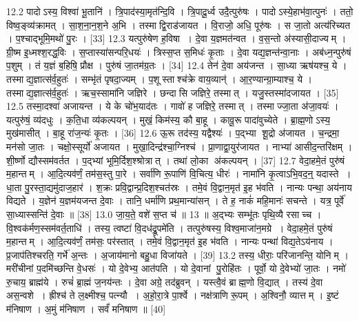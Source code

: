 12.2
पादोऽस्य॒ विश्वा॑ भू॒तानि॑ । त्रि॒पाद॑स्या॒मृत॑न्दि॒वि । त्रि॒पादू॒र्ध्व उदै॒त्पुरु॑षः । पादोऽस्ये॒हाभ॑वा॒त्पुनः॑ । ततो॒ विष्व॒ङ्व्य॑क्रामत् । सा॒श॒ना॒न॒श॒ने अ॒भि । तस्माद्वि॒राड॑जायत । वि॒राजो॒ अधि॒ पूरु॑षः । स जा॒तो अत्य॑रिच्यत । प॒श्चाद्भूमि॒मथो॑ पु॒रः । [33]
12.3
यत्पुरु॑षेण ह॒विषा । दे॒वा य॒ज्ञमत॑न्वत । व॒स॒न्तो अ॑स्यासी॒दाज्यम् । ग्री॒ष्म इ॒ध्मश्श॒रद्ध॒विः । स॒प्तास्या॑सन्परि॒धयः॑ । त्रिस्स॒प्त स॒मिधः॑ कृ॒ताः । दे॒वा यद्य॒ज्ञन्त॑न्वा॒नाः । अब॑ध्न॒न्पुरु॑षं प॒शुम् । तं य॒ज्ञं ब॒\ar{}हिषि॒ प्रौक्ष\sn{} । पुरु॑षं जा॒तम॑ग्र॒तः । [34]
12.4
तेन॑ दे॒वा अय॑जन्त । सा॒ध्या ऋष॑यश्च॒ ये । तस्माद्य॒ज्ञात्स॑र्व॒हुतः॑ । सम्भृ॑तं पृषदा॒ज्यम् । प॒शूस्ताश्च॑क्रे वाय॒व्यान्॑ । आ॒र॒ण्यान्ग्रा॒म्याश्च॒ ये । तस्माद्य॒ज्ञात्स॑र्व॒हुतः॑ । ऋच॒स्सामा॑नि जज्ञिरे । छन्दासि जज्ञिरे॒ तस्मात् । यजु॒स्तस्मा॑दजायत । [35]
12.5
तस्मा॒दश्वा॑ अजायन्त । ये के चो॑भ॒याद॑तः । गावो॑ ह जज्ञिरे॒ तस्मात् । तस्माज्जा॒ता अ॑जा॒वयः॑ । यत्पुरु॑षं॒ व्य॑दधुः । क॒ति॒धा व्य॑कल्पयन् । मुखं॒ किम॑स्य॒ कौ बा॒हू । कावू॒रू पादा॑वुच्येते । ब्रा॒ह्म॒णोऽस्य॒ मुख॑मासीत् । बा॒हू रा॑ज॒न्यः॑ कृ॒तः । [36]
12.6
ऊ॒रू तद॑स्य॒ यद्वैश्यः॑ । प॒द्भ्या शू॒द्रो अ॑जायत । च॒न्द्रमा॒ मन॑सो जा॒तः । चक्षो॒स्सूर्यो॑ अजायत । मुखा॒दिन्द्र॑श्चा॒ग्निश्च॑ । प्रा॒णाद्वा॒युर॑जायत । नाभ्या॑ आसीद॒न्तरि॑क्षम् । शी॒र्ष्णो द्यौस्सम॑वर्तत । प॒द्भ्यां भूमि॒र्दिश॒श्श्रोत्रात् । तथा॑ लो॒का अ॑कल्पयन् । [37]
12.7
वेदा॒हमे॒तं पुरु॑षं म॒हान्तम् । आ॒दि॒त्यव॑र्णं॒ तम॑स॒स्तु पा॒रे । सर्वा॑णि रू॒पाणि॑ वि॒चित्य॒ धीरः॑ । नामा॑नि कृ॒त्वाऽभि॒वद॒न्॒ यदास्ते । धा॒ता पु॒रस्ता॒द्यमु॑दाज॒हार॑ । श॒क्रः प्रवि॒द्वान्प्र॒दिश॒श्चत॑स्रः । तमे॒वं वि॒द्वान॒मृत॑ इ॒ह भ॑वति । नान्यः पन्था॒ अय॑नाय विद्यते । य॒ज्ञेन॑ य॒ज्ञम॑यजन्त दे॒वाः । तानि॒ धर्मा॑णि प्रथ॒मान्या॑सन् । ते ह॒ नाकं॑ महि॒मानः॑ सचन्ते । यत्र॒ पूर्वे॑ सा॒ध्यास्सन्ति॑ दे॒वाः ॥ [38]
13.0
जा॒य॒ते॒ वशे॑ स॒प्त च॑ ॥ 13 ॥
अ॒द्भ्यः सम्भू॑तः पृथि॒व्यै रसाच्च । वि॒श्वक॑र्मण॒स्सम॑वर्त॒ताधि॑ । तस्य॒ त्वष्टा॑ वि॒दध॑द्रू॒पमे॑ति । तत्पुरु॑षस्य॒ विश्व॒माजा॑न॒मग्रे । वेदा॒हमे॒तं पुरु॑षं म॒हान्तम् । आ॒दि॒त्यव॑र्णं॒ तम॑सः॒ पर॑स्तात् । तमे॒वं वि॒द्वान॒मृत॑ इ॒ह भ॑वति । नान्यः पन्था॑ विद्य॒तेऽय॑नाय । प्र॒जाप॑तिश्चरति॒ गर्भे॑ अ॒न्तः । अ॒जाय॑मानो बहु॒धा विजा॑यते । [39]
13.2
तस्य॒ धीराः॒ परि॑जानन्ति॒ योनिम् । मरी॑चीनां प॒दमि॑च्छन्ति वे॒धसः॑ । यो दे॒वेभ्य॒ आत॑पति । यो दे॒वानां पु॒रोहि॑तः । पूर्वो॒ यो दे॒वेभ्यो॑ जा॒तः । नमो॑ रु॒चाय॒ ब्राह्म॑ये । रुचं॑ ब्रा॒ह्मं ज॒नय॑न्तः । दे॒वा अग्रे॒ तद॑ब्रुवन् । यस्त्वै॒वं ब्राह्म॒णो वि॒द्यात् । तस्य॑ दे॒वा अस॒न्वशे । ह्रीश्च॑ ते ल॒क्ष्मीश्च॒ पत्न्यौ । अ॒हो॒रा॒त्रे पा॒र्श्वे । नक्ष॑त्राणि रू॒पम् । अ॒श्विनौ॒ व्यात्तम् । इ॒ष्टं म॑निषाण । अ॒मुं म॑निषाण । सर्वं॑ मनिषाण ॥ [40]
